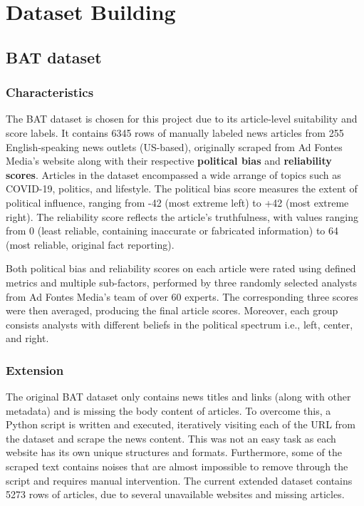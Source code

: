 \chapter{Dataset Building}
\label{cha:4}

\section{BAT dataset}

\subsection{Characteristics}

The BAT dataset \cite{spinde-2023-bat} is chosen for this project due to its article-level suitability and score labels. It contains 6345 rows of manually labeled news articles from 255 English-speaking news outlets (US-based), originally scraped from Ad Fontes Media's website along with their respective \textbf{political bias} and \textbf{reliability scores}. Articles in the dataset encompassed a wide arrange of topics such as COVID-19, politics, and lifestyle. The political bias score measures the extent of political influence, ranging from -42 (most extreme left) to +42 (most extreme right). The reliability score reflects the article's truthfulness, with values ranging from 0 (least reliable, containing inaccurate or fabricated information) to 64 (most reliable, original fact reporting).

Both political bias and reliability scores on each article were rated using defined metrics and multiple sub-factors, performed by three randomly selected analysts from Ad Fontes Media's team of over 60 experts. The corresponding three scores were then averaged, producing the final article scores. Moreover, each group consists analysts with different beliefs in the political spectrum i.e., left, center, and right.

\subsection{Extension}

The original BAT dataset only contains news titles and links (along with other metadata) and is missing the body content of articles. To overcome this, a Python script is written and executed, iteratively visiting each of the URL from the dataset and scrape the news content. This was not an easy task as each website has its own unique structures and formats. Furthermore, some of the scraped text contains noises that are almost impossible to remove through the script and requires manual intervention. The current extended dataset contains 5273 rows of articles, due to several unavailable websites and missing articles.

